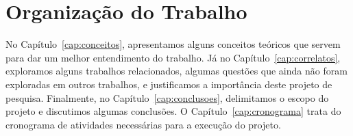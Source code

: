 \section{Organização do Trabalho}
\label{sec:organizacao_trabalho}


No Capítulo~\ref{cap:conceitos}, apresentamos alguns conceitos teóricos que servem para dar um melhor entendimento do trabalho. Já no Capítulo~\ref{cap:correlatos}, exploramos alguns trabalhos relacionados, algumas questões que ainda não foram exploradas em outros trabalhos, e justificamos a importância deste projeto de pesquisa.
Finalmente, no Capítulo~\ref{cap:conclusoes}, delimitamos o escopo do projeto e discutimos algumas conclusões. O Capítulo~\ref{cap:cronograma} trata do cronograma de atividades necessárias para a execução do projeto.
